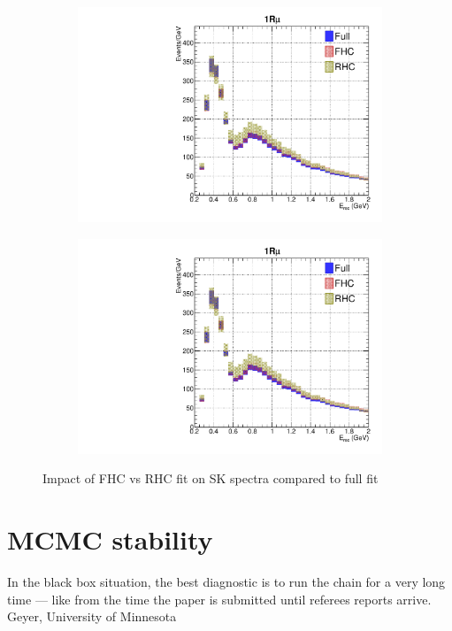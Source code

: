 \begin{figure}[h]
	\begin{subfigure}[t]{0.32\textwidth}
		\includegraphics[width=\textwidth, trim={0mm 0mm 0mm 0mm}, clip, page=4]{figures/mach3/data/alt/try_2017_fit_on_sk_spectra_posterior_sk_error_run2to4_spectra_posterior_sk_error_run5to6_spectra}
	\end{subfigure}
	\begin{subfigure}[t]{0.32\textwidth}
		\includegraphics[width=\textwidth, trim={0mm 0mm 0mm 0mm}, clip, page=5]{figures/mach3/data/alt/try_2017_fit_on_sk_spectra_posterior_sk_error_run2to4_spectra_posterior_sk_error_run5to6_spectra}
	\end{subfigure}
	
	\caption{Impact of FHC vs RHC fit on SK spectra compared to full fit}
	\label{fig:sk_fhcvsrhc}
\end{figure}

\section{MCMC stability}
In the black box situation, the best diagnostic is to run the chain
for a very long time — like from the time the paper is submitted
until referees reports arrive. Geyer, University of Minnesota

\clearpage